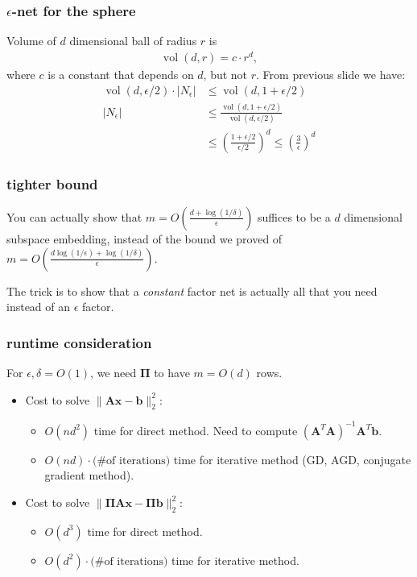 \documentclass[compress]{beamer}
\newcommand{\bs}[1]{\boldsymbol{#1}}
\newcommand{\bv}[1]{\mathbf{#1}}
\DeclareMathOperator{\vol}{vol}
\begin{document}
\begin{frame}[t]
	\frametitle{$\epsilon$-net for the sphere}
	Volume of $d$ dimensional ball of radius $r$ is 
	\begin{align*}
		\vol(d,r) = c\cdot r^d,
	\end{align*}
	where $c$ is a constant that depends on $d$, but not $r$.
	\vspace{1em}
	From previous slide we have:
	\begin{align*}
		\vol(d,\epsilon/2) \cdot |N_\epsilon| &\leq \vol(d,1+\epsilon/2) \\  
		|N_\epsilon| &\leq \frac{\vol(d,1+\epsilon/2)}{\vol(d,\epsilon/2)} \\
		&\leq \left(\frac{1+\epsilon/2}{\epsilon/2}\right)^d\leq \left(\frac{3}{\epsilon}\right)^d
	\end{align*}
\end{frame}

\begin{frame} 
	\frametitle{tighter bound}
	You can actually show that $m = O\left(\frac{d + \log(1/\delta)}{\epsilon}\right)$ suffices to be a $d$ dimensional subspace embedding, instead of the bound we proved of $m = O\left(\frac{d\log(1/\epsilon) + \log(1/\delta)}{\epsilon}\right)$.
	
	The trick is to show that a \emph{constant} factor net is actually all that you need instead of an $\epsilon$ factor. 
	\end{frame}

\begin{frame}[t]
	\frametitle{runtime consideration}
	For $\epsilon, \delta = O(1)$, we need $\bs{\Pi}$ to have $m = O(d)$ rows.
	\begin{itemize}
		\item Cost to solve $\|\bv{A}\bv{x} - \bv{b}\|_2^2$: 
		\begin{itemize}
			\item \alert{$O(nd^2)$} time for direct method. Need to compute $(\bv{A}^T\bv{A})^{-1}\bv{A}^T\bv{b}$.
			\item \alert{$O(nd)\cdot \text{(\# of iterations)}$} time for iterative method (GD, AGD, conjugate gradient method).
		\end{itemize}
		\item Cost to solve $\|\bs{\Pi}\bv{A}\bv{x} - \bs{\Pi}\bv{b}\|_2^2$: 
		\begin{itemize}
			\item \alert{$O(d^3)$} time for direct method. 
			\item \alert{$O(d^2)\cdot \text{(\# of iterations)}$} time for iterative method.
		\end{itemize}
	\end{itemize}
\end{frame}
\end{document}
